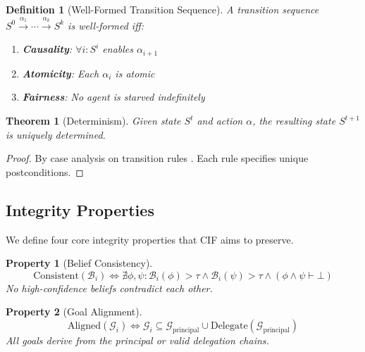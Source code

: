 \documentclass[
]{article}
\newtheorem{definition}{Definition}[section]
\newtheorem{theorem}{Theorem}[section]
\newtheorem{property}{Property}[section]
\begin{document}
\begin{definition}[Well-Formed Transition Sequence]
\label{def:well-formed}
A transition sequence $S^0 \xrightarrow{\alpha_1} \cdots \xrightarrow{\alpha_k} S^k$ is well-formed iff:
\begin{enumerate}
\item \textbf{Causality}: $\forall i: S^i$ enables $\alpha_{i+1}$
\item \textbf{Atomicity}: Each $\alpha_i$ is atomic
\item \textbf{Fairness}: No agent is starved indefinitely
\end{enumerate}
\end{definition}

\begin{theorem}[Determinism]
\label{thm:determinism}
Given state $S^t$ and action $\alpha$, the resulting state $S^{t+1}$ is uniquely determined.
\end{theorem}

\begin{proof}
By case analysis on transition rules . Each rule specifies unique postconditions.
\end{proof}

\subsection{Integrity Properties}\label{sec:integrity-properties}

We define four core integrity properties that CIF aims to preserve.

\begin{property}[Belief Consistency]
\label{prop:belief-consistency}
\begin{equation}
\label{eq:belief-consistency}
\text{Consistent}(\mathcal{B}_i) \iff \nexists \phi, \psi: \mathcal{B}_i(\phi) > \tau \land \mathcal{B}_i(\psi) > \tau \land (\phi \land \psi \vdash \bot)
\end{equation}
No high-confidence beliefs contradict each other.
\end{property}

\begin{property}[Goal Alignment]
\label{prop:goal-alignment}
\begin{equation}
\label{eq:goal-alignment}
\text{Aligned}(\mathcal{G}_i) \iff \mathcal{G}_i \subseteq \mathcal{G}_{\text{principal}} \cup \text{Delegate}(\mathcal{G}_{\text{principal}})
\end{equation}
All goals derive from the principal or valid delegation chains.
\end{property}
\end{document}
